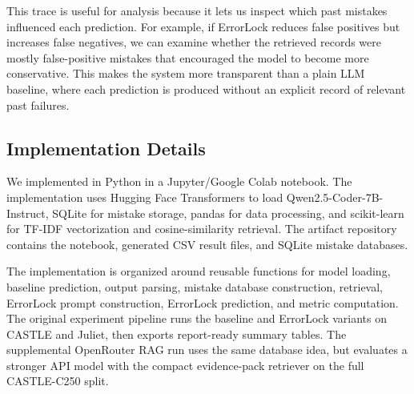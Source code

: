 This trace is useful for analysis because it lets us inspect which past mistakes influenced each prediction. For example, if ErrorLock reduces false positives but increases false negatives, we can examine whether the retrieved records were mostly false-positive mistakes that encouraged the model to become more conservative. This makes the system more transparent than a plain LLM baseline, where each prediction is produced without an explicit record of relevant past failures.

\subsection{Implementation Details}

We implemented \system in Python in a Jupyter/Google Colab notebook. The implementation uses Hugging Face Transformers to load Qwen2.5-Coder-7B-Instruct, SQLite for mistake storage, pandas for data processing, and scikit-learn for TF-IDF vectorization and cosine-similarity retrieval. The artifact repository contains the notebook, generated CSV result files, and SQLite mistake databases.

The implementation is organized around reusable functions for model loading, baseline prediction, output parsing, mistake database construction, retrieval, ErrorLock prompt construction, ErrorLock prediction, and metric computation. The original experiment pipeline runs the baseline and ErrorLock variants on CASTLE and Juliet, then exports report-ready summary tables. The supplemental OpenRouter RAG run uses the same database idea, but evaluates a stronger API model with the compact evidence-pack retriever on the full CASTLE-C250 split.
